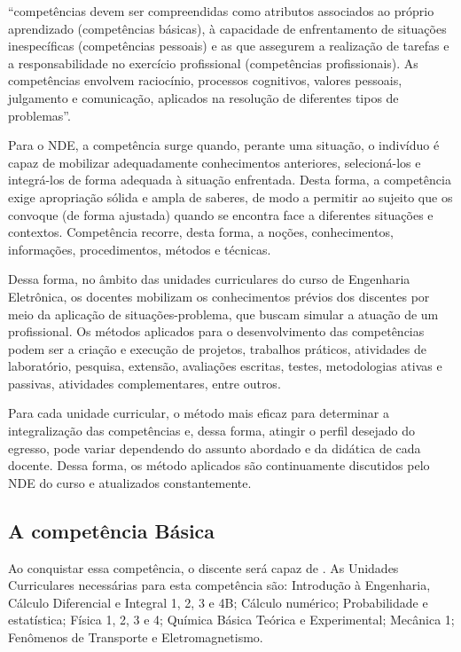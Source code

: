 \begin{citacao}
    ``competências devem ser compreendidas como atributos associados ao próprio aprendizado (competências básicas), à capacidade de enfrentamento de situações inespecíficas (competências pessoais) e as que assegurem a realização de tarefas e a responsabilidade no exercício profissional (competências profissionais).  As competências envolvem raciocínio, processos cognitivos, valores pessoais, julgamento e comunicação, aplicados na resolução de diferentes tipos de problemas''.
\end{citacao} 

Para o NDE, a competência surge quando, perante uma situação, o indivíduo é capaz de mobilizar adequadamente conhecimentos anteriores, selecioná-los e integrá-los de forma adequada à situação enfrentada. Desta forma, a competência exige apropriação sólida e ampla de saberes, de modo a permitir ao sujeito que os convoque (de forma ajustada) quando se encontra face a diferentes situações e contextos. Competência recorre, desta forma, a noções, conhecimentos, informações, procedimentos, métodos e técnicas.

Dessa forma, no âmbito das unidades curriculares do curso de Engenharia Eletrônica, os docentes mobilizam os conhecimentos prévios dos discentes por meio da aplicação de situações-problema, que buscam simular a atuação de um profissional. Os métodos aplicados para o desenvolvimento das competências podem ser a criação e execução de projetos, trabalhos práticos, atividades de laboratório, pesquisa, extensão, avaliações escritas, testes, metodologias ativas e passivas, atividades complementares, entre outros. 

Para cada unidade curricular, o método mais eficaz para determinar a integralização das competências e, dessa forma, atingir o perfil desejado do egresso, pode variar dependendo do assunto abordado e da didática de cada docente. Dessa forma, os método aplicados são continuamente discutidos pelo NDE do curso e atualizados constantemente.

\subsection{A competência Básica}

Ao conquistar essa competência, o discente será capaz de \textbf{\compBasica}. As Unidades Curriculares necessárias para esta competência são: Introdução à Engenharia, Cálculo Diferencial e Integral 1, 2, 3 e 4B; Cálculo numérico; Probabilidade e estatística; Física 1, 2, 3 e 4; Química Básica Teórica e Experimental; Mecânica 1; Fenômenos de Transporte e Eletromagnetismo.

